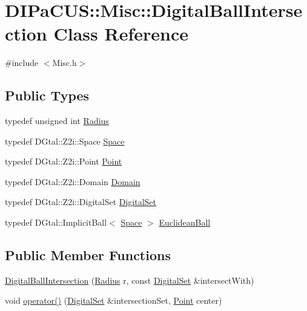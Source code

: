 \hypertarget{classDIPaCUS_1_1Misc_1_1DigitalBallIntersection}{}\section{D\+I\+Pa\+C\+US\+:\+:Misc\+:\+:Digital\+Ball\+Intersection Class Reference}
\label{classDIPaCUS_1_1Misc_1_1DigitalBallIntersection}


{\ttfamily \#include $<$Misc.\+h$>$}

\subsection*{Public Types}
\begin{DoxyCompactItemize}
\item 
typedef unsigned int \mbox{\hyperlink{classDIPaCUS_1_1Misc_1_1DigitalBallIntersection_a8c17265617201b52046579d379b3e269}{Radius}}
\item 
typedef D\+Gtal\+::\+Z2i\+::\+Space \mbox{\hyperlink{classDIPaCUS_1_1Misc_1_1DigitalBallIntersection_a70219652541b1d322f832184d5f79209}{Space}}
\item 
typedef D\+Gtal\+::\+Z2i\+::\+Point \mbox{\hyperlink{classDIPaCUS_1_1Misc_1_1DigitalBallIntersection_a7e348073cb818df2e225d22746e1d6af}{Point}}
\item 
typedef D\+Gtal\+::\+Z2i\+::\+Domain \mbox{\hyperlink{classDIPaCUS_1_1Misc_1_1DigitalBallIntersection_a23d82ed15613f37ad616a455bcce7542}{Domain}}
\item 
typedef D\+Gtal\+::\+Z2i\+::\+Digital\+Set \mbox{\hyperlink{classDIPaCUS_1_1Misc_1_1DigitalBallIntersection_aaed19d165964a423d69f19a3de0d5587}{Digital\+Set}}
\item 
typedef D\+Gtal\+::\+Implicit\+Ball$<$ \mbox{\hyperlink{classDIPaCUS_1_1Misc_1_1DigitalBallIntersection_a70219652541b1d322f832184d5f79209}{Space}} $>$ \mbox{\hyperlink{classDIPaCUS_1_1Misc_1_1DigitalBallIntersection_aae4ce51777107424826d7f7d4a53eb8a}{Euclidean\+Ball}}
\end{DoxyCompactItemize}
\subsection*{Public Member Functions}
\begin{DoxyCompactItemize}
\item 
\mbox{\hyperlink{classDIPaCUS_1_1Misc_1_1DigitalBallIntersection_ad8f01116b05a8879e0644b57957810d0}{Digital\+Ball\+Intersection}} (\mbox{\hyperlink{classDIPaCUS_1_1Misc_1_1DigitalBallIntersection_a8c17265617201b52046579d379b3e269}{Radius}} r, const \mbox{\hyperlink{classDIPaCUS_1_1Misc_1_1DigitalBallIntersection_aaed19d165964a423d69f19a3de0d5587}{Digital\+Set}} \&intersect\+With)
\item 
void \mbox{\hyperlink{classDIPaCUS_1_1Misc_1_1DigitalBallIntersection_aa7e9ee375a80f5746cfc066666b0615d}{operator()}} (\mbox{\hyperlink{classDIPaCUS_1_1Misc_1_1DigitalBallIntersection_aaed19d165964a423d69f19a3de0d5587}{Digital\+Set}} \&intersection\+Set, \mbox{\hyperlink{classDIPaCUS_1_1Misc_1_1DigitalBallIntersection_a7e348073cb818df2e225d22746e1d6af}{Point}} center)
\end{DoxyCompactItemize}
